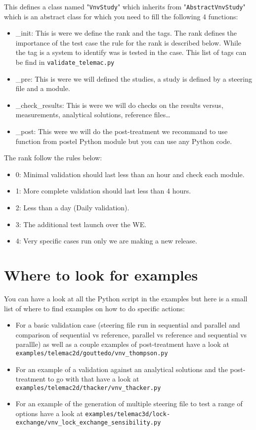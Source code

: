 This defines a class named "\verb!VnvStudy!" which inherits from
"\verb!AbstractVnvStudy!" which is an abstract class for which you need to fill
the following 4 functions:
\begin{itemize}
\item \_init: This is were we define the rank and the tags. The rank defines
  the importance of the test case the rule for the rank is described below.
    While the tag is a system to identify was is tested in the case. This list
    of tags can be find in \verb!validate_telemac.py!
\item \_pre: This is were we will defined the studies, a study is defined by a
  steering file and a module.
\item \_check\_results: This is were we will do checks on the results versus,
  measurements, analytical solutions, reference files\ldots
\item \_post: This were we will do the post-treatment we recommand to use
  function from postel Python module but you can use any Python code.
\end{itemize}

The rank follow the rules below:
\begin{itemize}
\item 0: Minimal validation should last less than an hour and check each
  module.
\item 1: More complete validation should last less than 4 hours.
\item 2: Less than a day (Daily validation).
\item 3: The additional test launch over the WE.
\item 4: Very specific cases run only we are making a new release.
\end{itemize}

\section{Where to look for examples}
You can have a look at all the Python script in the examples but here is a
small list of where to find examples on how to do specific actions:
\begin{itemize}
\item For a basic validation case (steering file run in sequential and parallel
  and comparison of sequential vs reference, parallel vs reference and
    sequential vs parallle) as well as a couple examples of post-treatment have
    a look at \verb!examples/telemac2d/gouttedo/vnv_thompson.py!
\item For an example of a validation against an analytical solutions and the
  post-treatment to go with that have a look at
    \verb!examples/telemac2d/thacker/vnv_thacker.py!
\item For an example of the generation of multiple steering file to test a
  range of options have a look at
    \verb!examples/telemac3d/lock-exchange/vnv_lock_exchange_sensibility.py!
\end{itemize}

